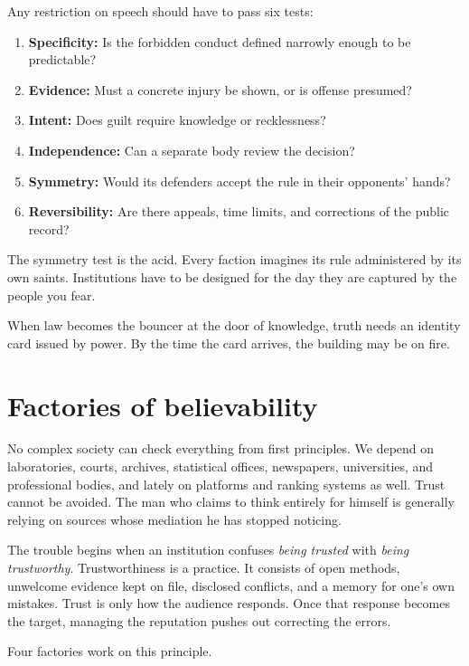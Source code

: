 \documentclass[12pt,a4paper]{book}
\begin{document}
Any restriction on speech should have to pass six tests:

\begin{enumerate}
  \item \textbf{Specificity:} Is the forbidden conduct defined narrowly enough to be predictable?
  \item \textbf{Evidence:} Must a concrete injury be shown, or is offense presumed?
  \item \textbf{Intent:} Does guilt require knowledge or recklessness?
  \item \textbf{Independence:} Can a separate body review the decision?
  \item \textbf{Symmetry:} Would its defenders accept the rule in their opponents' hands?
  \item \textbf{Reversibility:} Are there appeals, time limits, and corrections of the public record?
\end{enumerate}

The symmetry test is the acid. Every faction imagines its rule administered by its own saints. Institutions have to be designed for the day they are captured by the people you fear.

When law becomes the bouncer at the door of knowledge, truth needs an identity card issued by power. By the time the card arrives, the building may be on fire.

\section{Factories of believability}

No complex society can check everything from first principles. We depend on laboratories, courts, archives, statistical offices, newspapers, universities, and professional bodies, and lately on platforms and ranking systems as well. Trust cannot be avoided. The man who claims to think entirely for himself is generally relying on sources whose mediation he has stopped noticing.

The trouble begins when an institution confuses \emph{being trusted} with \emph{being trustworthy}. Trustworthiness is a practice. It consists of open methods, unwelcome evidence kept on file, disclosed conflicts, and a memory for one's own mistakes. Trust is only how the audience responds. Once that response becomes the target, managing the reputation pushes out correcting the errors.

Four factories work on this principle.
\end{document}
